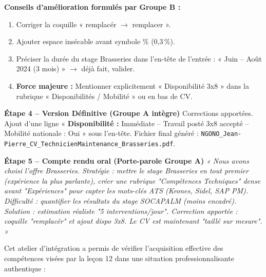 \documentclass[11pt]{article}
\newcounter{popsec}
\newcounter{popsub}
\newcommand{\courssub}[1]{%
  \stepcounter{popsub}%
  \par\vspace{9pt}\noindent{\popxbold\fontsize{11.5}{13}\selectfont\color{popink}{\color{poporange}\thepopsec.\thepopsub}\hspace{6pt}#1}\par\nopagebreak\vspace{4pt}
}
\begin{document}
\begin{exoresolu}
\textbf{Conseils d'amélioration formulés par Groupe B :}
\begin{enumerate}
    \item Corriger la coquille « remplacér $\to$ remplacer ».
    \item Ajouter espace insécable avant symbole \% (0,3\,\%).
    \item Préciser la durée du stage Brasseries dans l'en-tête de l'entrée : « Juin -- Août 2024 (3 mois) » $\to$ déjà fait, valider.
    \item \textbf{Force majeure :} Mentionner explicitement « Disponibilité 3x8 » dans la rubrique « Disponibilités / Mobilité » ou en bas de CV.
\end{enumerate}

\textbf{Étape 4 -- Version Définitive (Groupe A intègre)}
\noindent
Corrections apportées. Ajout d'une ligne « \textbf{Disponibilité :} Immédiate -- Travail posté 3x8 accepté -- Mobilité nationale : Oui » sous l'en-tête. Fichier final généré : \texttt{NGONO\_Jean-Pierre\_CV\_TechnicienMaintenance\_Brasseries.pdf}.

\textbf{Étape 5 -- Compte rendu oral (Porte-parole Groupe A)}
\noindent
\emph{« Nous avons choisi l'offre Brasseries. Stratégie : mettre le stage Brasseries en tout premier (expérience la plus parlante), créer une rubrique "Compétences Techniques" dense avant "Expériences" pour capter les mots-clés ATS (Krones, Sidel, SAP PM). Difficulté : quantifier les résultats du stage SOCAPALM (moins encadré). Solution : estimation réaliste "5 interventions/jour". Correction apportée : coquille "remplacér" et ajout dispo 3x8. Le CV est maintenant "taillé sur mesure". »}
\end{exoresolu}

\courssub{Bilan de l'activité}
\noindent
Cet atelier d'intégration a permis de vérifier l'acquisition effective des compétences visées par la leçon 12 dans une situation professionnalisante authentique :
\end{document}
